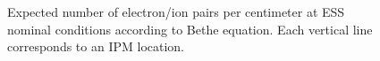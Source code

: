 \begin{figure}[!ht]
	
	\caption[Expected number of electron/ion pairs per centimeter at ESS nominal conditions according to Bethe equation]{Expected number of electron/ion pairs per centimeter at ESS nominal conditions according to Bethe equation. Each vertical line corresponds to an IPM location.}
	\label{chap3:ess_primary_particles}
\end{figure}
